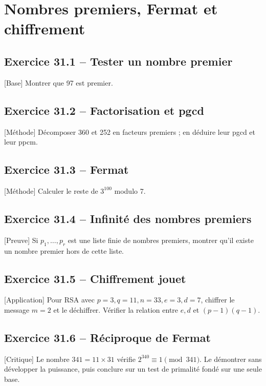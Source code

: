 \chapter{Nombres premiers, Fermat et chiffrement}
\section*{Exercice 31.1 -- Tester un nombre premier}
[Base] Montrer que 97 est premier.

\section*{Exercice 31.2 -- Factorisation et pgcd}
[Méthode] Décomposer 360 et 252 en facteurs premiers ; en déduire leur pgcd et leur ppcm.

\section*{Exercice 31.3 -- Fermat}
[Méthode] Calculer le reste de $3^{100}$ modulo 7.

\section*{Exercice 31.4 -- Infinité des nombres premiers}
[Preuve] Si $p_1,\ldots,p_r$ est une liste finie de nombres premiers, montrer qu'il existe un nombre premier hors de cette liste.

\section*{Exercice 31.5 -- Chiffrement jouet}
[Application] Pour RSA avec $p=3,q=11,n=33,e=3,d=7$, chiffrer le message $m=2$ et le déchiffrer. Vérifier la relation entre $e,d$ et $(p-1)(q-1)$.

\section*{Exercice 31.6 -- Réciproque de Fermat}
[Critique] Le nombre $341=11\times31$ vérifie $2^{340}\equiv1\pmod{341}$. Le démontrer sans développer la puissance, puis conclure sur un test de primalité fondé sur une seule base.
